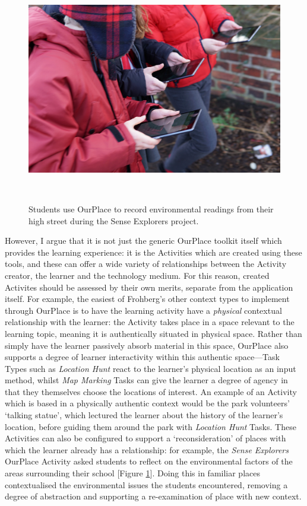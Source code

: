 \begin{figure}
\centering
  \includegraphics[width=0.85\columnwidth]{images/chapter09/senseExplorers.jpg}
  \caption[Students use OurPlace to record environmental readings from their high street]{Students use OurPlace to record environmental readings from their high street during the Sense Explorers project.}~\label{fig:senseExplorersHighSt}
\end{figure}

However, I argue that it is not just the generic OurPlace toolkit itself which provides the learning experience: it is the Activities which are created using these tools, and these can offer a wide variety of relationships between the Activity creator, the learner and the technology medium. For this reason, created Activites should be assessed by their own merits, separate from the application itself. For example, the easiest of Frohberg's other context types to implement through OurPlace is to have the learning activity have a \textit{physical} contextual relationship with the learner: the Activity takes place in a space relevant to the learning topic, meaning it is authentically situated in physical space. Rather than simply have the learner passively absorb material in this space, OurPlace also supports a degree of learner interactivity within this authentic space---Task Types such as \textit{Location Hunt} react to the learner's physical location as an input method, whilst \textit{Map Marking} Tasks can give the learner a degree of agency in that they themselves choose the locations of interest. An example of an Activity which is based in a physically authentic context would be the park volunteers' `talking statue', which lectured the learner about the history of the learner's location, before guiding them around the park with \textit{Location Hunt} Tasks. These Activities can also be configured to support a `reconsideration' of places with which the learner already has a relationship: for example, the \textit{Sense Explorers} OurPlace Activity asked students to reflect on the environmental factors of the areas surrounding their school [Figure \ref{fig:senseExplorersHighSt}]. Doing this in familiar places contextualised the environmental issues the students encountered, removing a degree of abstraction and supporting a re-examination of place with new context.

